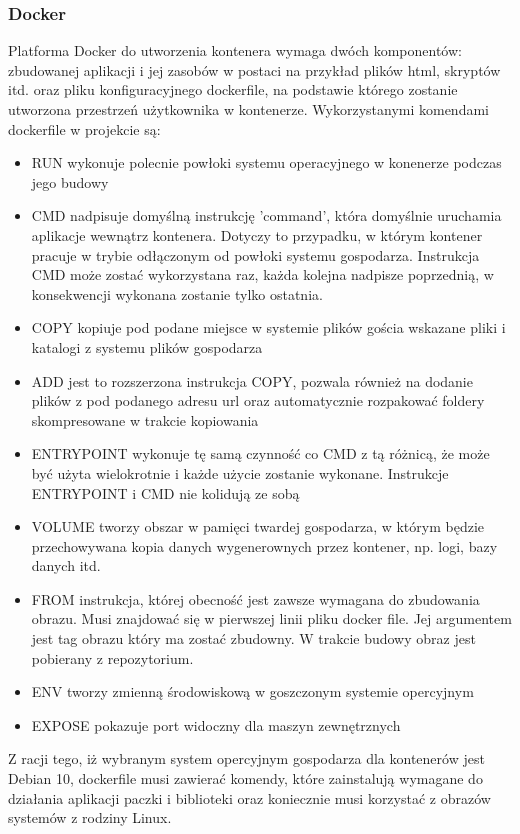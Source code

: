 \documentclass[polish, a4paper, 12pt, oneside]{book}
\begin{document}
\subsubsection{Docker}
Platforma Docker do utworzenia kontenera wymaga dwóch komponentów: zbudowanej aplikacji i jej zasobów w postaci na przykład plików html, skryptów itd. oraz pliku konfiguracyjnego dockerfile, na podstawie którego zostanie utworzona przestrzeń użytkownika w kontenerze. Wykorzystanymi komendami dockerfile w projekcie są:
\begin{itemize}[noitemsep]
	\item RUN wykonuje polecnie powłoki systemu operacyjnego w konenerze podczas jego budowy
	\item CMD nadpisuje domyślną instrukcję 'command', która domyślnie uruchamia aplikacje wewnątrz kontenera. Dotyczy to przypadku, w którym kontener pracuje w trybie odłączonym od powłoki systemu gospodarza. Instrukcja CMD może zostać wykorzystana raz, każda kolejna nadpisze poprzednią, w konsekwencji wykonana zostanie tylko ostatnia.
	\item COPY kopiuje pod podane miejsce w systemie plików gościa wskazane pliki i katalogi z systemu plików gospodarza
	\item ADD jest to rozszerzona instrukcja COPY, pozwala również na dodanie plików z pod podanego adresu url oraz automatycznie rozpakować foldery skompresowane w trakcie kopiowania
	\item ENTRYPOINT wykonuje tę samą czynność co CMD z tą różnicą, że może być użyta wielokrotnie i każde użycie zostanie wykonane. Instrukcje ENTRYPOINT i CMD nie kolidują ze sobą
	\item VOLUME tworzy obszar w pamięci twardej gospodarza, w którym będzie przechowywana kopia danych wygenerownych przez kontener, np. logi, bazy danych itd.
	\item FROM instrukcja, której obecność jest zawsze wymagana do zbudowania obrazu. Musi znajdować się w pierwszej linii pliku docker file. Jej argumentem jest tag obrazu który ma zostać zbudowny. W trakcie budowy obraz jest pobierany z repozytorium.
	\item ENV tworzy zmienną środowiskową w goszczonym systemie opercyjnym
	\item EXPOSE pokazuje port widoczny dla maszyn zewnętrznych
\end{itemize}
Z racji tego, iż wybranym system opercyjnym gospodarza dla kontenerów jest Debian 10, dockerfile musi zawierać komendy, które zainstalują wymagane do działania aplikacji paczki i biblioteki oraz koniecznie musi korzystać z obrazów systemów z rodziny Linux.
\end{document}

